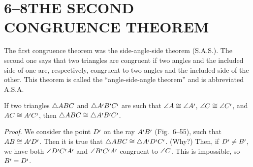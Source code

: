\documentclass[11pt]{book}
\begin{document}
\section*{6--8\quad THE SECOND CONGRUENCE THEOREM}

The first congruence theorem was the side-angle-side theorem (S.A.S.). The
second one says that two triangles are congruent if two angles and the included
side of one are, respectively, congruent to two angles and the included side of
the other. This theorem is called the ``angle-side-angle theorem'' and is
abbreviated A.S.A.

\begin{theorem}
If two triangles $\triangle ABC$ and $\tri{A\VIpr B\VIpr C\VIpr}$ are such that
$\ang{A} \cong \ang{A\VIpr}$, $\ang{C} \cong \ang{C\VIpr}$, and $AC \cong
A\VIpr C\VIpr$, then $\tri{ABC} \cong \tri{A\VIpr B\VIpr C\VIpr}$.
\end{theorem}

\FIGVIFIFTYFIVE

\emph{Proof.} We consider the point $D\VIpr$ on the ray $A\VIpr B\VIpr$
(Fig.~6--55), such that $AB \cong A\VIpr D\VIpr$. Then it is true that
$\tri{ABC} \cong \tri{A\VIpr D\VIpr C\VIpr}$. (Why?) Then, if $D\VIpr \neq
B\VIpr$, we have both $\ang{D\VIpr C\VIpr A\VIpr}$ and $\ang{B\VIpr C\VIpr
A\VIpr}$ congruent to $\angle C$. This is impossible, so $B\VIpr = D\VIpr$.

\begin{steps}
\end{steps}
\end{document}

